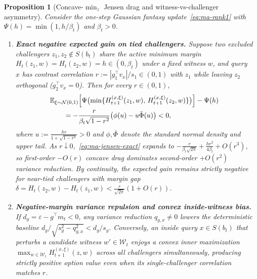 \documentclass{article}
\theoremstyle{plain}
\newtheorem{proposition}[theorem]{Proposition}
\theoremstyle{definition}
\begin{document}
\begin{proposition}[Concave-$\min_z$ Jensen drag and witness-vs-challenger asymmetry]
\label{prop:ma-jensen-drag}
Consider the one-step Gaussian fantasy update~\eqref{eq:ma-rank1} with $\Psi(h) = \min(1, h / \beta_t)$ and $\beta_t > 0$.
\begin{enumerate}[label=(\alph*),leftmargin=1.8em]
  \item \textbf{Exact negative expected gain on tied challengers.} Suppose two excluded challengers $z_1, z_2 \notin S(b_t)$ share the active minimum margin $H_t(z_1, w) = H_t(z_2, w) = h \in (0, \beta_t)$ under a fixed witness $w$, and query $x$ has contrast correlation $r := |g_1^\top v_x| / s_1 \in (0, 1)$ with $z_1$ while leaving $z_2$ orthogonal ($g_2^\top v_x = 0$). Then for every $r \in (0, 1)$,
  \begin{align}
    &\mathbb{E}_{\xi \sim \mathcal{N}(0, 1)}\Bigl[
      \Psi\bigl(\min\{H_{t+1}^{(x,\xi)}(z_1, w),\, H_{t+1}^{(x,\xi)}(z_2, w)\}\bigr)
    \Bigr] - \Psi(h) \nonumber\\
    &\qquad = -\frac{r}{\beta_t\sqrt{1 - r^2}}\bigl(\phi(u) - u\bar\Phi(u)\bigr) < 0,
    \label{eq:ma-jensen-exact}
  \end{align}
  where $u := \frac{h r}{1 + \sqrt{1 - r^2}} > 0$ and $\phi, \bar\Phi$ denote the standard normal density and upper tail. As $r \downarrow 0$,~\eqref{eq:ma-jensen-exact} expands to $-\frac{r}{\beta_t\sqrt{2\pi}} + \frac{h r^2}{4\beta_t} + O(r^3)$, so first-order $-O(r)$ concave drag dominates second-order $+O(r^2)$ variance reduction. By continuity, the expected gain remains strictly negative for near-tied challengers with margin gap $\delta = H_t(z_2, w) - H_t(z_1, w) < \frac{r}{\sqrt{2\pi}}(1 + O(r))$.
  \item \textbf{Negative-margin variance repulsion and convex inside-witness bias.} If $d_g = \varepsilon - g^\top m_t < 0$, any variance reduction $q_{g,x} \neq 0$ lowers the deterministic baseline $d_g / \sqrt{s_g^2 - q_{g,x}^2} < d_g / s_g$. Conversely, an inside query $x \in S(b_t)$ that perturbs a candidate witness $w' \in \mathcal{W}_t$ enjoys a \emph{convex} inner maximization $\max_{w \in \mathcal{W}_t} H_{t+1}^{(x,\xi)}(z, w)$ across all challengers simultaneously, producing strictly positive option value even when its single-challenger correlation matches $r$.
\end{enumerate}
\end{proposition}
\end{document}
